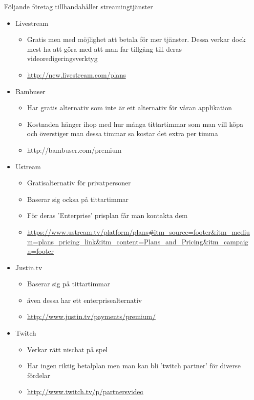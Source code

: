 \documentclass[a4paper,11pt]{article}
\begin{document}
Följande företag tillhandahåller streamingtjänster

  \begin{itemize}
    \item Livestream
      \begin{itemize}
      \item Gratis men med möjlighet att betala för mer tjänster.  Dessa
            verkar dock mest ha att göra med att man far tillgång till deras
            videoredigeringsverktyg
      \item \url{http://new.livestream.com/plans}
      \end{itemize}

    \item Bambuser
      \begin{itemize}
      \item Har gratis alternativ som inte är ett alternativ för våran applikation
      \item Kostnaden hänger ihop med hur många tittartimmar som man vill köpa
            och överstiger man dessa timmar sa kostar det extra per timma
      \item http://bambuser.com/premium
      \end{itemize}

    \item Ustream
      \begin{itemize}
      \item Gratisalternativ för privatpersoner
      \item Baserar sig ocksa på tittartimmar
      \item För deras 'Enterprise' prisplan får man kontakta dem
      \item \url{https://www.ustream.tv/platform/plans#itm_source=footer&itm_medium=plans_pricing_link&itm_content=Plans_and_Pricing&itm_campaign=footer}
      \end{itemize}

    \item Justin.tv
      \begin{itemize}
      \item Baserar sig på tittartimmar
      \item även dessa har ett enterprisealternativ
      \item \url{http://www.justin.tv/payments/premium/}
      \end{itemize}

    \item Twitch
      \begin{itemize}
      \item Verkar rätt nischat på spel
      \item Har ingen riktig betalplan men man kan bli 'twitch partner' för diverse fördelar
      \item \url{http://www.twitch.tv/p/partnersvideo}
      \end{itemize}
  \end{itemize}
\end{document}

